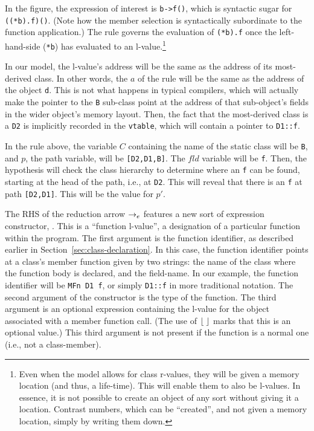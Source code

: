 \documentclass[11pt]{article}
\begin{document}
In the figure, the expression of interest is \texttt{b->f()}, which is
syntactic sugar for \texttt{((*b).f)()}.  (Note how the member
selection is syntactically subordinate to the function application.)
The  rule governs the evaluation of
\texttt{(*b).f} once the left-hand-side (\texttt{*b}) has evaluated to
an l-value.\footnote{Even when the model allows for class r-values,
  they will be given a memory location (and thus, a life-time).  This
  will enable them to also be l-values.  In essence, it is not
  possible to create an object of any sort without giving it a
  location.  Contrast numbers, which can be ``created'', and not given
  a memory location, simply by writing them down.}

In our model, the l-value's address will be the same as the address of
its most-derived class.  In other words, the $a$ of the rule will be
the same as the address of the object \texttt{d}.  This is not what
happens in typical compilers, which will actually make the pointer to
the \texttt{B} sub-class point at the address of that sub-object's
fields in the wider object's memory layout.  Then, the fact that the
most-derived class is a \texttt{D2} is implicitly recorded in the
\texttt{vtable}, which will contain a pointer to \texttt{D1::f}.

In the rule above, the variable $C$ containing the name of the static
class will be \texttt{B}, and $p$, the path variable, will be
\texttt{[D2,D1,B]}.  The $\mathit{fld}$ variable will be \texttt{f}.
Then, the hypothesis will check the class hierarchy to determine where
an \texttt{f} can be found, starting at the head of the path, i.e., at
\texttt{D2}.  This will reveal that there is an \texttt{f} at path
\texttt{[D2,D1]}.  This will be the value for $p'$.

The RHS of the reduction arrow $\rightarrow_e$ features a new sort of
expression constructor, \cfvalue{}.  This is a ``function l-value'', a
designation of a particular function within the program.  The first
argument is the function identifier, as described earlier in
Section~\ref{sec:class-declaration}.  In this case, the function
identifier points at a class's member function given by two strings:
the name of the class where the function body is declared, and the
field-name.  In our example, the function identifier will be
\texttt{MFn~D1~f}, or simply \texttt{D1::f} in more traditional \cpp{}
notation.  The second argument of the \cfvalue{} constructor is the
type of the function.  The third argument is an optional expression
containing the l-value for the object associated with a member
function call.  (The use of $\lfloor \; \rfloor$ marks that this is an optional
value.)  This third argument is not present if the function is a
normal one (i.e., not a class-member).
\end{document}
